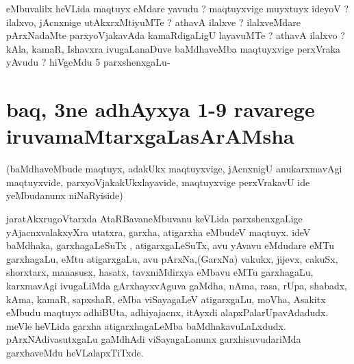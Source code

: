 \begin{artha}
eMbuvalilx heVLida maqtuyx eMdare yavudu ? maqtuyxvige muyxtuyx ideyoV ? ilalxvo, jAcnxnige  utAkxrxMtiyuMTe ? athavA ilalxve ? ilalxveMdare pArxNadaMte parxyoVjakavAda kamaRdigaLigU layavuMTe ? athavA ilalxvo ? kAla, kamaR, Ishavxra ivugaLanaDuve baMdhaveMba maqtuyxvige perxVraka yAvudu ? hiVgeMdu 5 parxshenxgaLu-
\end{artha}


\section*{baq, 3ne adhAyxya 1-9 ravarege iruvamaMtarxgaLasArAMsha}

\begin{artha}
(baMdhaveMbude maqtuyx, adakUkx maqtuyxvige, jAcnxnigU anukarxmavAgi maqtuyxvide, 
parxyoVjakakUkxlayavide, maqtuyxvige perxVrakavU ide yeMbudanunx niNaRyiside)

jaratAkxrugoVtarxda AtaRBavaneMbuvanu keVLida parxshenxgaLige yAjacnxvalakxyXra utatxra, 
garxha, atigarxha eMbudeV maqtuyx. ideV baMdhaka, garxhagaLeSuTx , atigarxgaLeSuTx, avu 
yAvavu eMdudare eMTu garxhagaLu, eMtu atigarxgaLu, avu pArxNa,(GarxNa) vakukx, jijevx, 
cakuSx, shorxtarx, manasusx, hasatx, tavxniMdirxya eMbavu eMTu garxhagaLu, karxmavAgi 
ivugaLiMda gArxhayxvAguva gaMdha, nAma, rasa, rUpa, shabadx, kAma, kamaR, sapxshaR, eMba 
viSayagaLeV atigarxgaLu, moVha, Asakitx eMbudu maqtuyx adhiBUta, adhiyajacnx, itAyxdi 
alapxPalarUpavAdadudx. meVle heVLida garxha atigarxhagaLeMba baMdhakavuLaLxdudx. 
pArxNAdivasutxgaLu gaMdhAdi viSayagaLanunx garxhisuvudariMda garxhaveMdu heVLalapxTiTxde.
\end{artha}
